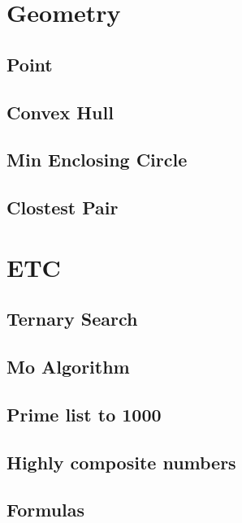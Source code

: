 \section{Geometry}
\subsection{Point}
\raggedbottom
\hrulefill
\subsection{Convex Hull}
\raggedbottom
\hrulefill
\subsection{Min Enclosing Circle}
\raggedbottom
\hrulefill
\subsection{Clostest Pair}
\raggedbottom
\hrulefill

\section{ETC}
\subsection{Ternary Search}
\raggedbottom
\hrulefill
\subsection{Mo Algorithm}
\raggedbottom
\hrulefill
\subsection{Prime list to 1000}
\raggedbottom
\hrulefill
\subsection{Highly composite numbers}
\raggedbottom
\hrulefill
\subsection{Formulas}
\raggedbottom
\hrulefill
